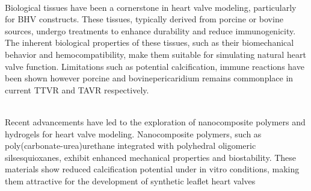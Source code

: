 \\
Biological tissues have been a cornerstone in heart valve modeling, particularly for \gls{BHV} constructs. These tissues, typically derived from porcine or bovine sources, undergo treatments to enhance durability and reduce immunogenicity. The inherent biological properties of these tissues, such as their biomechanical behavior and hemocompatibility, make them suitable for simulating natural heart valve function. Limitations such as potential calcification, immune reactions have been shown however porcine and bovinepericaridium remains commonplace in current \gls{TTVR} and \gls{TAVR} respectively. ~

\\
Recent advancements have led to the exploration of nanocomposite polymers  and hydrogels for heart valve modeling. Nanocomposite polymers, such as poly(carbonate-urea)urethane integrated with polyhedral oligomeric silsesquioxanes, exhibit enhanced mechanical properties and biostability. These materials show reduced calcification potential under in vitro conditions, making them attractive for the development of synthetic leaflet heart valves ~

